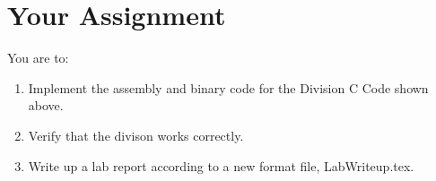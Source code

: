 \section{Your Assignment}

You are to:
\begin{enumerate}
\item Implement the assembly and binary code for the Division C Code shown above.
\item Verify that the divison works correctly.
\item Write up a lab report according to a new format file, LabWriteup.tex.
\end{enumerate} 